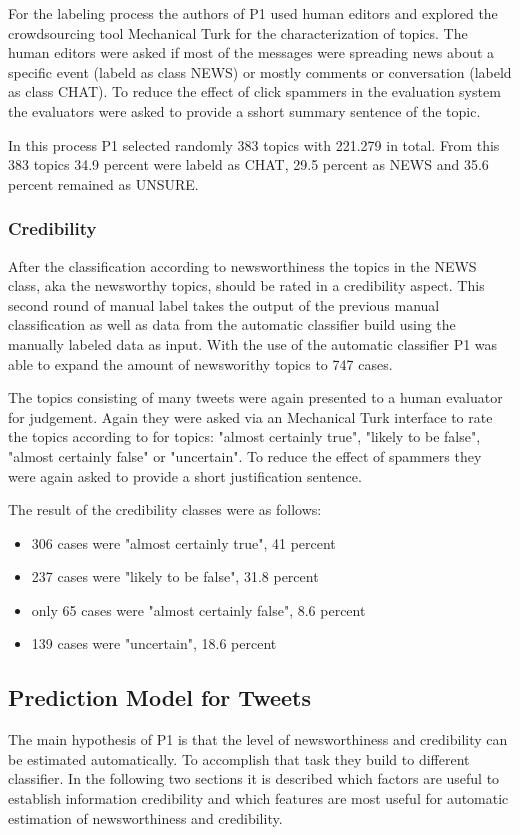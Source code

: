 \documentclass{proseminar}
\begin{document}
For the labeling process the authors of P1 used human editors and explored the crowdsourcing tool Mechanical Turk for the characterization of topics.
The human editors were asked if most of the messages were spreading news about a specific event (labeld as class NEWS) or mostly comments or conversation (labeld as class CHAT). To  reduce the effect of click spammers in the evaluation system the evaluators were asked to provide a sshort summary sentence of the topic.

In this process P1 selected randomly 383 topics with 221.279 in total. From this 383 topics 34.9 percent were labeld as CHAT, 29.5 percent as NEWS and 35.6 percent remained as UNSURE.


\subsubsection*{Credibility}
After the classification according to newsworthiness the topics in the NEWS class, aka the newsworthy topics, should be rated in a credibility aspect.
This second round of manual label takes the output of the previous manual classification as well as data from the automatic classifier build using the manually labeled data as input. With the use of the automatic classifier P1 was able to expand the amount of newsworithy topics to 747 cases.

The topics consisting of many tweets were again presented to a human evaluator for judgement. Again they were asked via an Mechanical Turk interface to rate the topics according to for topics: "almost certainly true", "likely to be false", "almost certainly false" or "uncertain". To reduce the effect of spammers they were again asked to provide a short justification sentence. 

The result of the credibility classes were as follows:
\begin{itemize}
\item 306 cases were "almost certainly true", 41 percent
\item 237 cases were "likely to be false", 31.8 percent
\item only 65 cases were "almost certainly false", 8.6 percent
\item 139 cases were "uncertain", 18.6 percent
\end{itemize}

\subsection{Prediction Model for Tweets}
The main hypothesis of P1 is that the level of newsworthiness and credibility can be estimated automatically. To accomplish that task they build to different classifier. In the following two sections it is described which factors are useful to establish  information credibility and which features are most useful for automatic estimation of newsworthiness and credibility.
\end{document}
